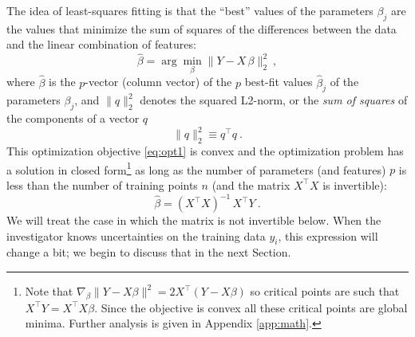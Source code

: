 \documentclass[12pt,letterpaper]{article}
\newcommand{\sectionname}{Section}
\begin{document}
The idea of least-squares fitting is that the ``best'' values of the parameters $\beta_j$ are the values that minimize the sum of squares of the differences between the data and the linear combination of features:
\begin{equation}\label{eq:opt1}
    \hat{\beta} = \arg\min_\beta \|Y - X\,\beta\|_2^2
    ~,
\end{equation}
where $\hat{\beta}$ is the $p$-vector (column vector) of the $p$ best-fit values $\hat{\beta}_j$ of the parameters $\beta_j$, and $\|q\|_2^2$ denotes the squared L2-norm, or the \emph{sum of squares} of the components of a vector $q$
\begin{equation}
    \|q\|_2^2 \equiv q^\top q
    ~.
\end{equation}
This optimization objective \eqref{eq:opt1} is convex and the optimization problem has a solution in closed form\footnote{
Note that $\nabla_{\beta} \|Y-X\beta\|^2 = 2X^\top(Y-X\beta)$ so critical points are such that $X^\top Y= X^\top X\beta$. Since the objective is convex all these critical points are global minima. Further analysis is given in Appendix \ref{app:math}.
} as long as the number of parameters (and features) $p$ is less than the number of training points $n$ (and the matrix $X^\top X$ is invertible):
\begin{equation}
    \hat{\beta} = (X^\top X)^{-1}\,X^\top Y
    ~.
    \label{OLS-under}
\end{equation}
We will treat the case in which the matrix is not invertible below.
When the investigator knows uncertainties on the training data $y_i$, this expression will change a bit; we begin to discuss that in the next \sectionname.
\end{document}
